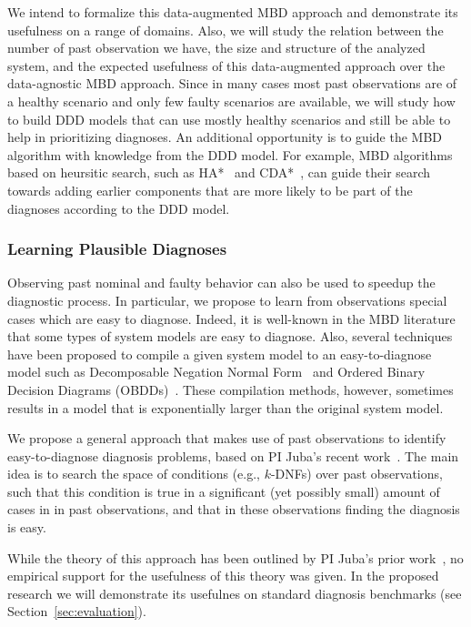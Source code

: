 \documentclass[12pt]{article}
\newcommand{\note}[1]{\textbf{\textit{#1}}}
\begin{document}
We intend to formalize this data-augmented MBD approach and demonstrate its usefulness on a range of domains. Also, we will study the relation between the number of past observation we have, the size and structure of the analyzed system, and the expected usefulness of this data-augmented approach over the data-agnostic MBD approach. Since in many cases most past observations are of a healthy scenario and only few faulty scenarios are available, we will study how to build DDD models that can use mostly healthy scenarios and still be able to help in prioritizing diagnoses. An additional opportunity is to guide the MBD algorithm with knowledge from the DDD model. For example, MBD algorithms based on heursitic search, such as HA*~\cite{feldman2006two} and CDA*~\cite{williams2007conflict}, can guide their search towards adding earlier components that are more likely to be part of the diagnoses according to the DDD model. 


\subsubsection{Learning Plausible Diagnoses} 
Observing past nominal and faulty behavior can also be used to speedup the diagnostic process. In particular, we propose to learn from observations special cases which are easy to diagnose. Indeed, it is well-known in the MBD literature that some types of system models are  easy to diagnose. Also, several techniques have been proposed to compile a given system model to an easy-to-diagnose model such as Decomposable Negation Normal Form~\cite{darwiche2001decomposable} and Ordered Binary Decision Diagrams (OBDDs)~\cite{torta2006onTheUse}. These compilation methods, however, sometimes results in a model that is exponentially larger than the original system model. 


We propose a general approach that makes use of past observations to identify easy-to-diagnose diagnosis problems, based on PI Juba's recent work~\cite{juba2016aaai}. 
The main idea is to search the space of  conditions (e.g., $k$-DNFs) over past observations, such that this condition is true in a significant (yet possibly small) amount of cases in in past observations, 
and that in these observations finding the diagnosis is easy. 

While the theory of this approach has been outlined by PI Juba's prior work~\cite{juba2016aaai}, no empirical support for the usefulness of this theory was given. In the proposed research we will demonstrate its usefulnes on standard diagnosis benchmarks (see Section~\ref{sec:evaluation}). 
\end{document}
